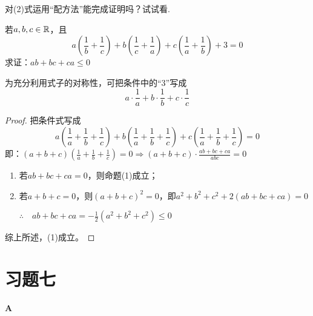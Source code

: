 \begin{blk}
    对(2)式运用“配方法”能完成证明吗？试试看.
\end{blk}

\begin{example}
若$a,b,c\in\mathbb{R}$，且
\begin{equation}
    a\left(\frac{1}{b}+\frac{1}{c}\right)+
    b\left(\frac{1}{c}+\frac{1}{a}\right)+
    c\left(\frac{1}{a}+\frac{1}{b}\right)+3=0  \tag{1}
\end{equation}
求证：$ab+bc+ca\le 0$
\end{example}

\begin{analyze}
    为充分利用式子的对称性，可把条件中的“3”写成
\[a\cdot \frac{1}{a}+b\cdot \frac{1}{b}+c\cdot \frac{1}{c}\]
\end{analyze}

\begin{proof}
    把条件式写成
\[a\left(\frac{1}{a}+\frac{1}{b}+\frac{1}{c}\right)+b\left(\frac{1}{a}+\frac{1}{b}+\frac{1}{c}\right)+c\left(\frac{1}{a}+\frac{1}{b}+\frac{1}{c}\right)=0\]
即：$(a+b+c)\left(\frac{1}{a}+\frac{1}{b}+\frac{1}{c}\right)=0\Longrightarrow (a+b+c)\cdot \frac{ab+bc+ca}{abc}=0$

\begin{enumerate}
    \item 若$ab+bc+ca=0$，则命题(1)成立；
    \item 若$a+b+c=0$，则$(a+b+c)^2=0$，即$a^2+b^2+c^2+2(ab+bc+ca)=0$
    
    $\therefore\quad ab+bc+ca=-\frac{1}{2}(a^2+b^2+c^2)\le 0$
\end{enumerate}
综上所述，(1)成立。
\end{proof}

\section*{习题七}
\begin{center}
    \bfseries A
\end{center}

